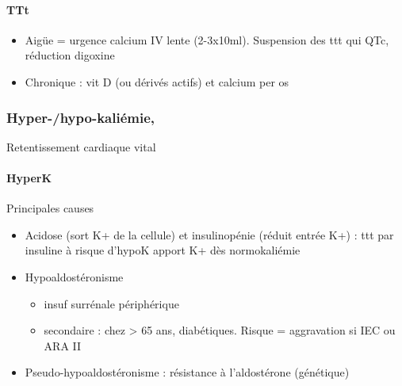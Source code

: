 \documentclass[11pt]{article}
\begin{document}
\paragraph{TTt}
\label{sec:orgd556dca}
\begin{itemize}
\item Aigüe = urgence \faBomb \thus calcium IV lente (2-3x10ml). Suspension des ttt qui \inc
QTc, réduction digoxine
\item Chronique : vit D (ou dérivés actifs) et calcium per os
\end{itemize}

\subsubsection{Hyper-/hypo-kaliémie,}
\label{sec:orgcaf7740}
Retentissement cardiaque \thus vital \faBomb

\paragraph{HyperK}
\label{sec:org4ffac20}
Principales causes
\begin{itemize}
\item Acidose (sort K+ de la cellule) et insulinopénie (réduit entrée K+) : ttt par
insuline à risque d'hypoK \danger \thus apport K+ dès normokaliémie
\item Hypoaldostéronisme
\begin{itemize}
\item insuf surrénale périphérique
\item secondaire : chez > 65 ans, diabétiques. Risque = aggravation si IEC ou ARA II
\end{itemize}
\item Pseudo-hypoaldostéronisme : résistance à l'aldostérone (génétique)
\end{itemize}
\end{document}
